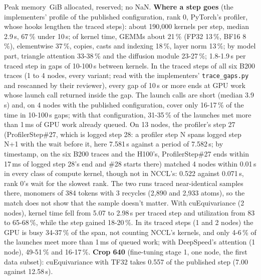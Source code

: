 Peak memory \TriOfMemAlloc\,GiB allocated, \TriOfMemRes{} reserved; no NaN. \textbf{Where a step goes} (the implementers' profile of the published configuration, rank 0, PyTorch's profiler, whose hooks lengthen the traced steps): about 190,000 kernels per step, median 2.9\,\textmu s, 67\,\% under 10\,\textmu s; of kernel time, GEMMs about 21\,\% (FP32 13\,\%, BF16 8\,\%), elementwise 37\,\%, copies, casts and indexing 18\,\%, layer norm 13\,\%; by model part, triangle attention 33-38\,\% and the diffusion module 23-27\,\%; 1.8-1.9\,s per traced step in gaps of 10-100\,\textmu s between kernels. In the traced steps of all six B200 traces (1 to 4 nodes, every variant; read with the implementers' \texttt{trace\_gaps.py} and rescanned by their reviewer), every gap of 10\,\textmu s or more ends at GPU work whose launch call returned inside the gap. The launch calls are short (median 3.9\,\textmu s) and, on 4 nodes with the published configuration, cover only 16-17\,\% of the time in 10-100\,\textmu s gaps; with that configuration, 31-35\,\% of the launches met more than 1\,ms of GPU work already queued. On 13 nodes, the profiler's step 27 (ProfilerStep\#27, which is logged step 28: a profiler step N spans logged step N+1 with the wait before it, here 7.581\,s against a period of 7.582\,s; by timestamp, on the six B200 traces and the H100's, ProfilerStep\#27 ends within 17\,ms of logged step 28's end and \#28 starts there) matched 4 nodes within 0.01\,s in every class of compute kernel, though not in NCCL's: 0.522 against 0.071\,s, rank 0's wait for the slowest rank. The two runs traced near-identical samples there, monomers of 384 tokens with 3 recycles (2,890 and 2,933 atoms), so the match does not show that the sample doesn't matter. With cuEquivariance (2 nodes), kernel time fell from 5.07 to 2.98\,s per traced step and utilization from 83 to 65-68\,\%, while the step gained 18-20\,\%. In its traced steps (1 and 2 nodes) the GPU is busy 34-37\,\% of the span, not counting NCCL's kernels, and only 4-6\,\% of the launches meet more than 1\,ms of queued work; with DeepSpeed's attention (1 node), 49-51\,\% and 16-17\,\%. \textbf{Crop 640} (fine-tuning stage 1, one node, the first data subset): cuEquivariance with TF32 takes 0.557 of the published step (7.00 against 12.58\,s).

